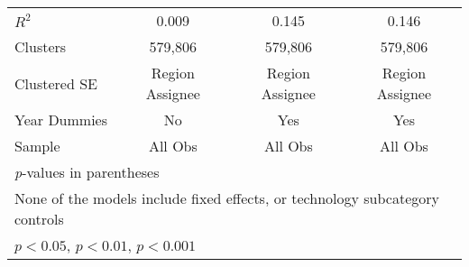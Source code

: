 {\begin{longtable}{l*{3}{c}}
$R^2$              &    0.009         &    0.145         &    0.146         \\
Clusters         &  579,806         &  579,806         &  579,806         \\
Clustered SE       &Region Assignee         &Region Assignee         &Region Assignee         \\
Year Dummies            &       No         &      Yes         &      Yes         \\
Sample          &  All Obs         &  All Obs         &  All Obs         \\
\hline\hline
\multicolumn{4}{l}{\footnotesize \textit{p}-values in parentheses}\\
\multicolumn{4}{l}{\footnotesize None of the models include fixed effects, or technology subcategory controls}\\
\multicolumn{4}{l}{\footnotesize \sym{*} \(p<0.05\), \sym{**} \(p<0.01\), \sym{***} \(p<0.001\)}\\
\end{longtable}
}
